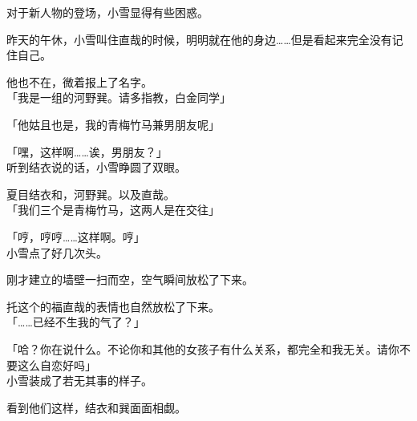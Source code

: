 对于新人物的登场，小雪显得有些困惑。

昨天的午休，小雪叫住直哉的时候，明明就在他的身边……但是看起来完全没有记住自己。

他也不在，微着报上了名字。\\

「我是一组的河野巽。请多指教，白金同学」

「他姑且也是，我的青梅竹马兼男朋友呢」

「嘿，这样啊……诶，男朋友？」\\

听到结衣说的话，小雪睁圆了双眼。

夏目结衣和，河野巽。以及直哉。\\

「我们三个是青梅竹马，这两人是在交往」

「哼，哼哼……这样啊。哼」\\

小雪点了好几次头。

刚才建立的墙壁一扫而空，空气瞬间放松了下来。

托这个的福直哉的表情也自然放松了下来。\\

「……已经不生我的气了？」

「哈？你在说什么。不论你和其他的女孩子有什么关系，都完全和我无关。请你不要这么自恋好吗」\\

小雪装成了若无其事的样子。

看到他们这样，结衣和巽面面相觑。
